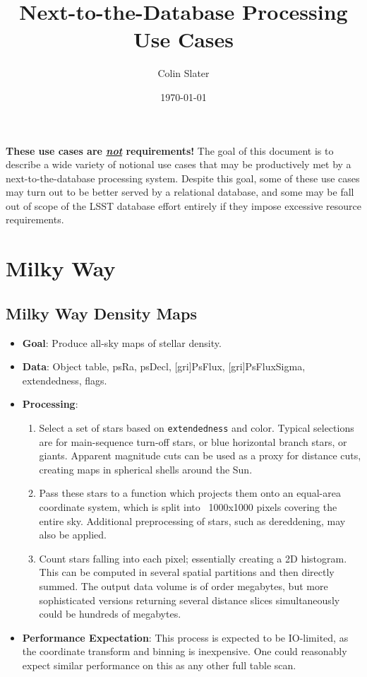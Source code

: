 \documentclass[DM,authoryear,toc]{lsstdoc}
\title{Next-to-the-Database Processing Use Cases}
\author{%
Colin Slater
}
\date{\today}
\begin{document}
\maketitle


\textbf{These use cases are \textit{\underline{not}} requirements!} The goal of
this document is to describe a wide variety of notional use cases that may be
productively met by a next-to-the-database processing system. Despite this goal,
some of these use cases may turn out to be better served by a relational
database, and some may be fall out of scope of the LSST database effort entirely
if they impose excessive resource requirements.


\section{Milky Way}

\subsection{Milky Way Density Maps}
\label{mw_density}

\begin{itemize}
  \item \textbf{Goal}: Produce all-sky maps of stellar density.
  \item \textbf{Data}: Object table, psRa, psDecl, [gri]PsFlux, [gri]PsFluxSigma,
  extendedness, flags.
  \item \textbf{Processing}:
    \begin{enumerate}
      \item Select a set of stars based on \texttt{extendedness} and color.
      Typical selections are for main-sequence turn-off stars, or blue
      horizontal branch stars, or giants. Apparent magnitude cuts can be used as
      a proxy for distance cuts, creating maps in spherical shells around the
      Sun.
      \item Pass these stars to a function which projects them onto an
      equal-area coordinate system, which is split into ~1000x1000 pixels
      covering the entire sky. Additional preprocessing of stars, such as
      dereddening, may also be applied.
      \item Count stars falling into each pixel; essentially creating a 2D
      histogram. This can be computed in several spatial partitions and then
      directly summed. The output data volume is of order megabytes, but more
      sophisticated versions returning several distance slices simultaneously
      could be hundreds of megabytes.
    \end{enumerate}
  \item \textbf{Performance Expectation}: This process is expected to be
  IO-limited, as the coordinate transform and binning is inexpensive. One could
  reasonably expect similar performance on this as any other full table scan.
\end{itemize}
\end{document}

